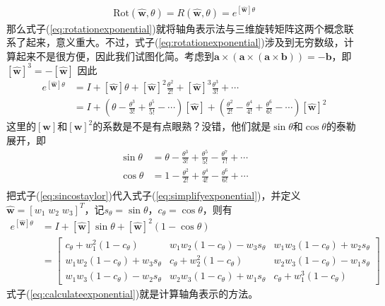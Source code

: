 \documentclass[12pt, a4paper, article, UTF8]{ctexart}
\begin{document}
\begin{align}
\text{Rot}(\hat{\mathbf{w}}, \theta) = R(\hat{\mathbf{w}}, \theta) = e^{[\hat{\mathbf{w}}]\theta} \label{eq:rotationexponential}
\end{align}
那么式子(\ref{eq:rotationexponential})就将轴角表示法与三维旋转矩阵这两个概念联系了起来，意义重大。不过，式子(\ref{eq:rotationexponential})涉及到无穷数级，计算起来不是很方便，因此我们试图化简。考虑到$ \mathbf{a}\times(\mathbf{a}\times(\mathbf{a}\times \mathbf{b})) =  -\mathbf{b}$，即$[\hat{\mathbf{w}}]^3 = -[\hat{\mathbf{w}}]$
因此
\begin{align}
e^{[\hat{\mathbf{w}}]\theta} &= I + [\hat{\mathbf{w}}]\theta+[\hat{\mathbf{w}}]^2\frac{\theta^2}{2!} + [\hat{\mathbf{w}}]^3\frac{\theta^3}{3!} + \cdots \nonumber \\
&=I + (\theta-\frac{\theta^3}{3!} + \frac{\theta^5}{5!}-\cdots)[\hat{\mathbf{w}}] + (\frac{\theta^2}{2!} - \frac{\theta^4}{4!} + \frac{\theta^6}{6!} -\cdots)[\hat{\mathbf{w}}]^2 \label{eq:simplifyexponential}
\end{align}
这里的$[\mathbf{w}]$和$[\mathbf{w}]^2$的系数是不是有点眼熟？没错，他们就是$\sin\theta$和$\cos\theta$的泰勒展开，即
\begin{align}
\sin\theta &= \theta - \frac{\theta^3}{3!} + \frac{\theta^5}{5!} - \frac{\theta^7}{7!} + \cdots \nonumber\\
\cos\theta &= 1 - \frac{\theta^2}{2!} + \frac{\theta^4}{4!} -\frac{\theta^6}{6!} + \cdots \nonumber\\
\label{eq:sincostaylor}
\end{align}
把式子(\ref{eq:sincostaylor})代入式子(\ref{eq:simplifyexponential})，并定义$\hat{\mathbf{w}} = [w_1\;w_2\;w_3]^T$，记$s_\theta = \sin{\theta}$，$c_\theta = \cos{\theta}$，则有
\begin{align}
e^{[\hat{\mathbf{w}}]\theta} &= I + [\hat{\mathbf{w}}]\sin\theta + [\hat{\mathbf{w}}]^2(1-\cos\theta)  \nonumber \\
&= \begin{bmatrix}
c_\theta +w^2_1(1-c_\theta) & w_1w_2(1-c_\theta)-w_3s_\theta & w_1w_3(1-c_\theta)+w_2s_\theta\\
w_1w_2(1-c_\theta)+w_3s_\theta&c_\theta +w^2_2(1-c_\theta)&w_2w_3(1-c_\theta)-w_1s_\theta
\\w_1w_3(1-c_\theta)-w_2s_\theta & w_2w_3(1-c_\theta)+w_1s_\theta &c_\theta +w^3_1(1-c_\theta)
\end{bmatrix} \label{eq:calculateexponential}
\end{align}
式子(\ref{eq:calculateexponential})就是计算轴角表示的方法。
\end{document}
